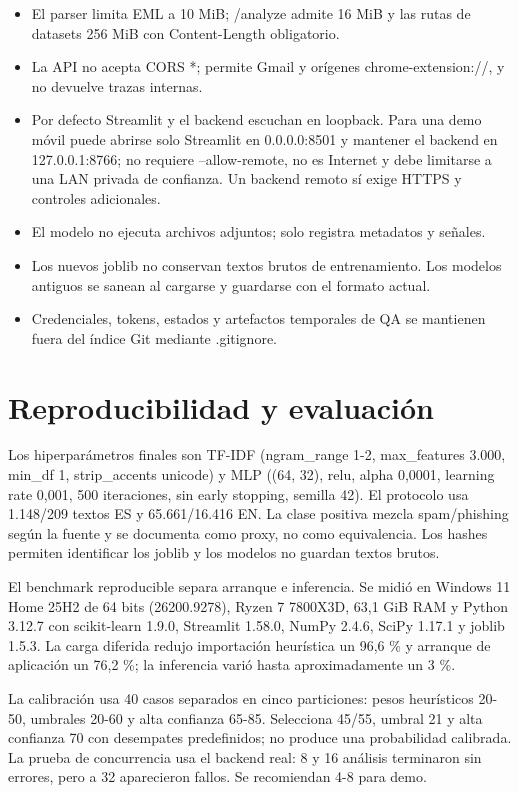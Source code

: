 \documentclass[11pt,a4paper]{article}
\begin{document}
\begin{itemize}
  \item El parser limita EML a 10 MiB; /\allowbreak{}analyze admite 16 MiB y las rutas de datasets 256 MiB con Content-Length obligatorio.
  \item La API no acepta CORS *; permite Gmail y orígenes chrome-extension:/\allowbreak{}/\allowbreak{}, y no devuelve trazas internas.
  \item Por defecto Streamlit y el backend escuchan en loopback. Para una demo móvil puede abrirse solo Streamlit en 0.0.0.0:8501 y mantener el backend en 127.0.0.1:8766; no requiere --allow-remote, no es Internet y debe limitarse a una LAN privada de confianza. Un backend remoto sí exige HTTPS y controles adicionales.
  \item El modelo no ejecuta archivos adjuntos; solo registra metadatos y señales.
  \item Los nuevos joblib no conservan textos brutos de entrenamiento. Los modelos antiguos se sanean al cargarse y guardarse con el formato actual.
  \item Credenciales, tokens, estados y artefactos temporales de QA se mantienen fuera del índice Git mediante .gitignore.
\end{itemize}

\section{Reproducibilidad y evaluación}

Los hiperparámetros finales son TF-IDF (ngram\_range 1-2, max\_features 3.000, min\_df 1, strip\_accents unicode) y MLP ((64, 32), relu, alpha 0,0001, learning rate 0,001, 500 iteraciones, sin early stopping, semilla 42). El protocolo usa 1.148/\allowbreak{}209 textos ES y 65.661/\allowbreak{}16.416 EN. La clase positiva mezcla spam/\allowbreak{}phishing según la fuente y se documenta como proxy, no como equivalencia. Los hashes permiten identificar los joblib y los modelos no guardan textos brutos.

El benchmark reproducible separa arranque e inferencia. Se midió en Windows 11 Home 25H2 de 64 bits (26200.9278), Ryzen 7 7800X3D, 63,1 GiB RAM y Python 3.12.7 con scikit-learn 1.9.0, Streamlit 1.58.0, NumPy 2.4.6, SciPy 1.17.1 y joblib 1.5.3. La carga diferida redujo importación heurística un 96,6 \% y arranque de aplicación un 76,2 \%; la inferencia varió hasta aproximadamente un 3 \%.

La calibración usa 40 casos separados en cinco particiones: pesos heurísticos 20-50, umbrales 20-60 y alta confianza 65-85. Selecciona 45/\allowbreak{}55, umbral 21 y alta confianza 70 con desempates predefinidos; no produce una probabilidad calibrada. La prueba de concurrencia usa el backend real: 8 y 16 análisis terminaron sin errores, pero a 32 aparecieron fallos. Se recomiendan 4-8 para demo.
\end{document}
